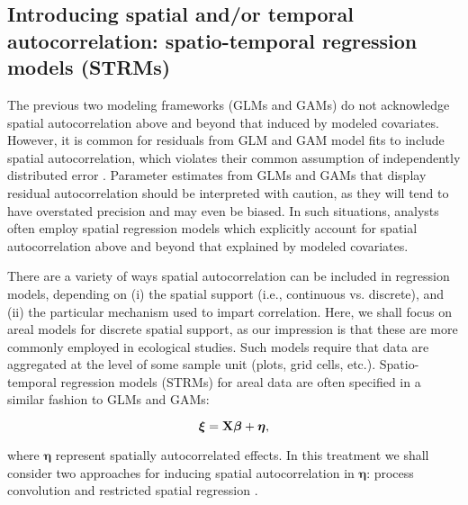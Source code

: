 \documentclass[12pt,fleqn]{article}
\begin{document}
\begin{flushleft}
\subsection{Introducing spatial and/or temporal autocorrelation: spatio-temporal regression models (STRMs)}

The previous two modeling frameworks (GLMs and GAMs) do not acknowledge spatial autocorrelation above and beyond that induced
by modeled covariates.  However, it is common for residuals from GLM and GAM model fits to include spatial autocorrelation, which violates their common assumption of independently distributed error \citep{Legendre1993,LichsteinEtAl2002}.  Parameter estimates from GLMs and GAMs that display residual autocorrelation should be interpreted with caution, as they will tend to have overstated precision and may even be biased.  In such situations, analysts often employ spatial regression models which explicitly account for spatial autocorrelation above and beyond that explained by modeled covariates.

There are a variety of ways spatial autocorrelation can be included in regression models, depending on (i) the spatial support (i.e., continuous vs. discrete), and (ii) the particular mechanism used to impart correlation.  Here, we shall focus on areal models for discrete spatial support, as our impression is that these are more commonly employed in ecological studies.  Such models require that data are aggregated at the level of some sample unit (plots, grid cells, etc.).  Spatio-temporal regression models (STRMs) for areal data are often specified in a similar fashion to GLMs and GAMs:
\begin{linenomath*}
\begin{equation}
  \label{eq:spat_reg}
  \boldsymbol{\xi}={\bf X} \boldsymbol{\beta} + \boldsymbol{\eta},
\end{equation}
\end{linenomath*}
where $\boldsymbol{\eta}$ represent spatially autocorrelated effects.  In this treatment we shall consider two approaches for
inducing spatial autocorrelation in $\boldsymbol{\eta}$: process convolution
\citep[PC;][]{Higdon1998} and restricted spatial regression \citep[RSR;][]{Reich2006,Hodges2010,Hughes2013}.


\end{flushleft}
\end{document}

